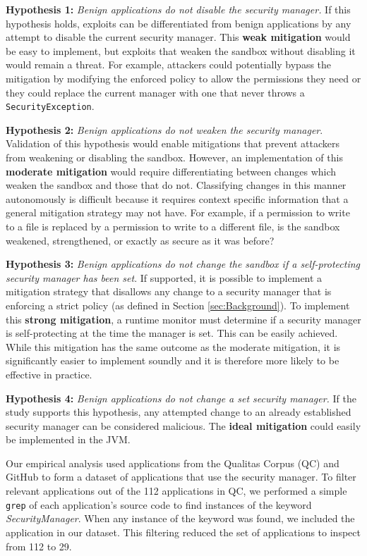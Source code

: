 \documentclass{sig-alternate}
\begin{document}
\textbf{Hypothesis 1:} \emph{Benign applications do not disable
the security manager.} If this hypothesis holds, exploits can be differentiated
from benign applications by any attempt to disable the current security
manager. This \textbf{weak mitigation} would be easy to implement,
but exploits that weaken the sandbox without disabling it would remain
a threat. For example, attackers could potentially bypass the mitigation
by modifying the enforced policy to allow the permissions they need
or they could replace the current manager with one that never throws
a \texttt{SecurityException}.

\textbf{Hypothesis 2:} \emph{Benign applications do not weaken the
security manager}. Validation of this hypothesis would enable
mitigations that prevent attackers from weakening or disabling the
sandbox. However, an implementation of this \textbf{moderate mitigation}
would require differentiating between changes which weaken the sandbox
and those that do not. Classifying changes in this manner autonomously is difficult
because it requires context specific information that a general mitigation
strategy may not have. For example, if a permission to write to a
file is replaced by a permission to write to a different file, is
the sandbox weakened, strengthened, or exactly as secure as it was
before?

\textbf{Hypothesis 3:} \emph{Benign applications do not change the
sandbox if a self-protecting security manager has been set}. If supported,
it is possible to implement a mitigation strategy that disallows any
change to a security manager that is enforcing a strict policy (as
defined in Section \ref{sec:Background}). To implement this \textbf{strong
mitigation}, a runtime monitor must determine if a security manager
is self-protecting at the time the manager is set. This can be easily
achieved. While this mitigation has the same outcome as the moderate
mitigation, it is significantly easier to implement soundly and it
is therefore more likely to be effective in practice. 

\textbf{Hypothesis 4:} \textit{Benign applications do not change a
set security manager.} If the study supports this hypothesis, any
attempted change to an already established security manager can be
considered malicious. The \textbf{ideal mitigation} could easily be
implemented in the JVM. 

Our empirical analysis used applications from the Qualitas Corpus
(QC) \cite{QualitasCorpus:APSEC:2010} and GitHub to form a dataset
of applications that use the security manager. To filter relevant
applications out of the 112 applications in QC, we performed a simple
\texttt{grep} of each application's source code to find instances
of the keyword \textit{SecurityManager}. When any instance of the
keyword was found, we included the application in our dataset. This
filtering reduced the set of applications to inspect from 112 to 29. 
\end{document}
